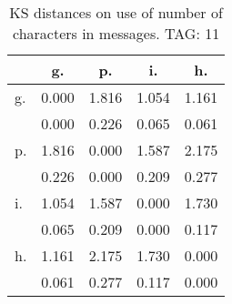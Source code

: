 \begin{table}[h!]
\begin{center}
\begin{tabular}{| l | c | c | c | c |}\hline
 & g. & p. & i. & h. \\\hline
g. & 0.000  & 1.816  & 1.054  & 1.161 \\\hline
 & 0.000  & 0.226  & 0.065  & 0.061 \\\hline
p. & 1.816  & 0.000  & 1.587  & 2.175 \\\hline
 & 0.226  & 0.000  & 0.209  & 0.277 \\\hline
i. & 1.054  & 1.587  & 0.000  & 1.730 \\\hline
 & 0.065  & 0.209  & 0.000  & 0.117 \\\hline
h. & 1.161  & 2.175  & 1.730  & 0.000 \\\hline
 & 0.061  & 0.277  & 0.117  & 0.000 \\\hline
\end{tabular}
\caption{KS distances on use of number of characters in messages. TAG: 11}
\end{center}
\end{table}